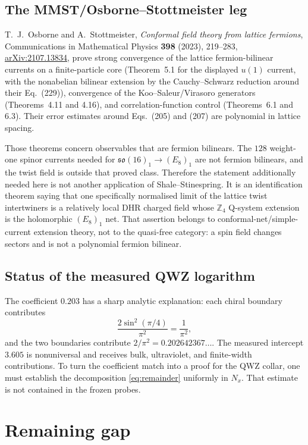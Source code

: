 \documentclass[11pt]{article}
\theoremstyle{remark}
\begin{document}
\subsection{The MMST/Osborne--Stottmeister leg}

T.~J.~Osborne and A.~Stottmeister,
\emph{Conformal field theory from lattice fermions},
Communications in Mathematical Physics \textbf{398} (2023), 219--283,
\href{https://arxiv.org/abs/2107.13834}{arXiv:2107.13834},
prove strong convergence of the lattice fermion-bilinear currents on a
finite-particle core (Theorem~5.1 for the displayed $u(1)$ current, with
the nonabelian bilinear extension by the Cauchy--Schwarz reduction around
their Eq.~(229)), convergence of the Koo--Saleur/Virasoro generators
(Theorems~4.11 and 4.16), and correlation-function control
(Theorems~6.1 and 6.3).  Their error estimates around Eqs.~(205) and
(207) are polynomial in lattice spacing.

Those theorems concern observables that are fermion bilinears.  The
$128$ weight-one spinor currents needed for
$\mathfrak{so}(16)_1\to(E_8)_1$ are not fermion bilinears, and the twist
field is outside that proved class.  Therefore the statement additionally
needed here is not another application of Shale--Stinespring.  It is an
identification theorem saying that one specifically normalised limit of
the lattice twist intertwiners is a relatively local DHR charged field
whose $\mathbb Z_4$ Q-system extension is the holomorphic $(E_8)_1$ net.
That assertion belongs to conformal-net/simple-current extension theory,
not to the quasi-free category: a spin field changes sectors and is not a
polynomial fermion bilinear.

\subsection{Status of the measured QWZ logarithm}

The coefficient $0.203$ has a sharp analytic explanation:
each chiral boundary contributes
\[
\frac{2\sin^2(\pi/4)}{\pi^2}=\frac1{\pi^2},
\]
and the two boundaries contribute $2/\pi^2=0.202642367\ldots$.
The measured intercept $3.605$ is nonuniversal and receives bulk,
ultraviolet, and finite-width contributions.  To turn the coefficient
match into a proof for the QWZ collar, one must establish the decomposition
\eqref{eq:remainder} uniformly in $N_x$.  That estimate is not contained
in the frozen probes.

\section{Remaining gap}
\end{document}
